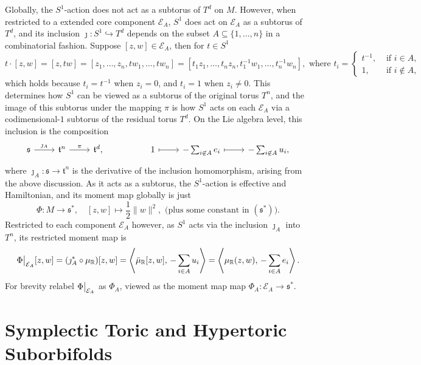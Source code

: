 \documentclass{amsart}
\newcommand{\ra}{\rightarrow}
\newcommand{\RR}{\mathbb{R}}
\newcommand{\mcE}{\mathcal{E}}
\newcommand{\mft}{\mathfrak{t}}
\newcommand{\mf}[1]{\mathfrak{#1}}
\newcommand\restr[2]{{%
		\left.\kern-\nulldelimiterspace %
		#1 %
		\vphantom{\big|} %
		\right|_{#2} %
}}
\begin{document}
	Globally, the $S^{1}$-action does not act as a subtorus of $T^{d}$ on $M$. However, when restricted to a extended core component $\mcE_{A}$, $S^{1}$ does act on $\mcE_{A}$ as a subtorus of $T^{d}$, and its inclusion $\jmath : S^{1} \hookrightarrow T^{d}$ depends on the subset $A \subseteq \{1, \ldots, n\}$ in a combinatorial fashion.
	Suppose $[z, w] \in \mcE_{A}$, then for $t \in S^{1}$
	\[
		t \cdot [z, w] = [z, tw] = [z_{1}, \ldots, z_{n}, tw_{1}, \ldots, tw_{n}] = [t_{1}z_{1}, \ldots, t_{n}z_{n}, t_{1}^{-1}w_{1}, \ldots, t_{n}^{-1}w_{n}], \text{ where } t_{i} =
		\begin{cases}
			t^{-1}, &\text{ if } i \in A, \\
			1, &\text{ if } i \not\in A,
		\end{cases}
	\]
	which holds because $t_{i} = t^{-1}$ when $z_{i} =0$, and $t_{i} = 1$ when $z_{i} \neq 0$.
	This determines how $S^{1}$ can be viewed as a subtorus of the original torus $T^{n}$, and the image of this subtorus under the mapping $\pi$ is how $S^{1}$ acts on each $\mcE_{A}$ via a codimensional-$1$ subtorus of the residual torus $T^{d}$. On the Lie algebra level, this inclusion is the composition
	\[
	\begin{tikzcd}[ampersand replacement=\&]
		\mf{s} \arrow[r, "\jmath_{A}"] \&
		\mft^{n} \arrow[r, "\pi"] \& \mft^{d}, \& \& 1 \arrow[r, mapsto] \& -\sum_{i \not\in A}e_{i} \arrow[r, mapsto] \& -\sum_{i \not\in A} u_{i},
	\end{tikzcd}
	\]
	where $\jmath_{A} : \mf{s} \ra \mft^{n}$ is the derivative of the inclusion homomorphism, arising from the above discussion. As it acts as a subtorus, the $S^{1}$-action is effective and Hamiltonian, and its moment map globally is just
	\[
		\Phi : M \ra \mf{s}^{\ast}, \quad [z,w] \mapsto \frac{1}{2}\|w\|^{2}, \text{ (plus some constant in } (\mf{s}^{\ast})\text{)}.
	\]
	Restricted to each component $\mcE_{A}$ however, as $S^{1}$ acts via the inclusion $\jmath_{A}$ into $T^{n}$, its restricted moment map is
	\[
		\restr{\Phi}{\mcE_{A}}[z,w] = (\jmath_{A}^{\ast} \circ \mu_{\RR})[z,w] = \left\langle \bar{\mu}_{\RR}[z,w], \, -\sum_{i \in A} u_{i} \right\rangle = \left\langle \mu_{\RR}(z,w), \, -\sum_{i \in A} e_{i} \right\rangle.
	\]
	For brevity relabel $\restr{\Phi}{\mcE_{A}}$ as $\Phi_{A}$, viewed as the moment map map $\Phi_{A} : \mcE_{A} \ra \mf{s}^{\ast}$.
	
	\section{Symplectic Toric and Hypertoric Suborbifolds}
	
\end{document}
